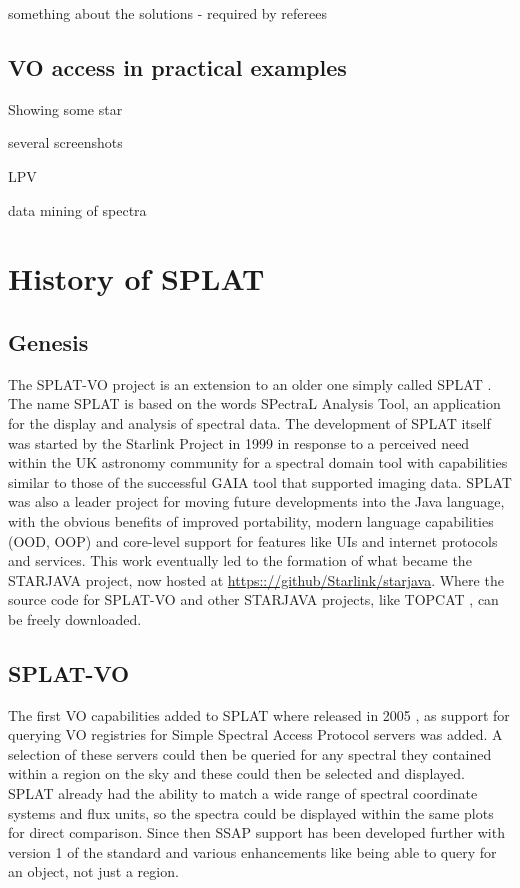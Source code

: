 \documentclass[final,authoryear,5p,times,twocolumn]{elsarticle}
\begin{document}
something about the solutions - required by referees





\subsection{VO access in practical examples}


Showing some star

several screenshots

LPV

data mining of spectra




\section{History of SPLAT}
\subsection{Genesis}

The SPLAT-VO project is an extension to an older one simply called
SPLAT \citep[][]{2002ASPC..281..513B}.  The name SPLAT
is based on the words SPectraL Analysis Tool, an application for the
display and analysis of spectral data. The development of SPLAT itself
was started by the Starlink Project \citep{1982QJRAS..23..485D} in
1999 in response to a perceived need within the UK astronomy community
for a spectral domain tool with capabilities similar to those of the
successful GAIA tool \citep[][]{2000ASPC..216..615D}
that supported imaging data. SPLAT was also a leader project for
moving future developments into the Java language, with the obvious
benefits of improved portability, modern language capabilities (OOD,
OOP) and core-level support for features like UIs and internet
protocols and services. This work eventually led to the formation of
what became the STARJAVA project, now hosted at
\url{https:://github/Starlink/starjava}. Where the source code for
SPLAT-VO and other STARJAVA projects, like TOPCAT
\citep[][]{2005ASPC..347...29T}, can be freely
downloaded.

\subsection{SPLAT-VO}

The first VO capabilities added to SPLAT where released in 2005
\citep{2005ASPC..347...22D}, as support for querying VO registries for
Simple Spectral Access Protocol servers was added. A selection of
these servers could then be queried for any spectral they contained
within a region on the sky and these could then be selected and
displayed. SPLAT already had the ability to match a wide range of
spectral coordinate systems and flux units, so the spectra could be
displayed within the same plots for direct comparison. Since then SSAP
support has been developed further with version 1 of the standard and
various enhancements like being able to query for an object, not just
a region.
\end{document}
